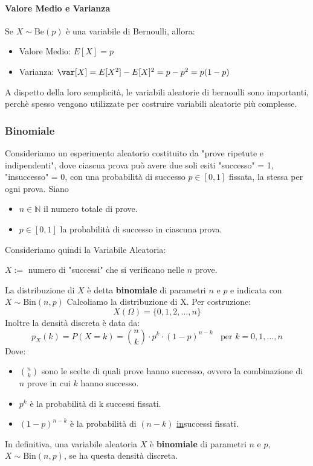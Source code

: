 \paragraph{Valore Medio e Varianza}
Se $X \sim \text{Be}(p)$ è una variabile di Bernoulli, allora:
\begin{itemize}
	\item Valore Medio: $E[X] = p$
	\item Varianza: $\var[X] = E[X^2] - E[X]^2 = p-p^2 = p(1-p)$
\end{itemize}
A dispetto della loro semplicità, le variabili aleatorie di bernoulli sono importanti, perchè spesso
vengono utilizzate per costruire variabili aleatorie più complesse.

\subsubsection{Binomiale}
Consideriamo un esperimento aleatorio costituito da "prove ripetute e indipendenti",
dove ciascua prova può avere due soli esiti "successo" = 1, "insuccesso" = 0, con una
probabilità di successo $p \in [0,1]$ fissata, la stessa per ogni prova.
Siano \begin{itemize}
	\item $n \in \mathbb{N}$ il numero totale di prove.
	\item $p \in [0,1]$ la probabilità di successo in ciascuna prova.
\end{itemize}
Consideriamo quindi la Variabile Aleatoria:
\begin{center}
	$X:=$ numero di "successi" che si verificano nelle $n$ prove.
\end{center}
La distribuzione di $X$ è detta \textbf{binomiale} di parametri $n$ e $p$ e indicata con $X \sim \text{Bin}(n,p)$
Calcoliamo la distribuzione di X. Per costruzione:
\[
	X(\Omega) = \{0,1,2,\dots,n\}
\]
Inoltre la densità discreta è data da:
\begin{equation*}
	p_X (k) = P(X=k) = \binom{n}{k} \cdot p^k \cdot (1-p)^{n-k} \;\;\text{ per } k = 0,1,\dots, n
\end{equation*}
Dove: \begin{itemize}
	\item $\binom{n}{k}$ sono le scelte di quali prove hanno successo,
	      ovvero la combinazione di $n$ prove in cui $k$ hanno successo.
	\item $p^k$ è la probabilità di k successi fissati.
	\item $(1-p)^{n-k}$ è la probabilità di $(n-k)$ \underline{in}successi fissati.
\end{itemize}
In definitiva, una variabile aleatoria $X$ è \textbf{binomiale} di parametri $n$ e $p$, $X \sim \text{Bin}(n,p)$,
se ha questa densità discreta.


